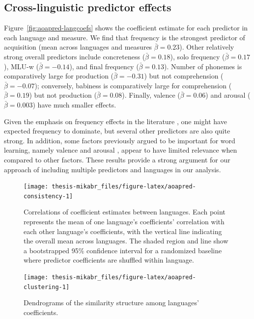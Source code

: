 \documentclass[
   11pt,
       ]{book}
\begin{document}
\hypertarget{cross-linguistic-predictor-effects}{%
\subsection{Cross-linguistic predictor effects}\label{cross-linguistic-predictor-effects}}

Figure~\ref{fig:aoapred-langcoefs} shows the coefficient estimate for each predictor in each language and measure.
We find that frequency is the strongest predictor of acquisition (mean across languages and measures \(\bar{\beta} = 0.23\)). Other relatively strong overall predictors include concreteness (\(\bar{\beta} = 0.18\)), solo frequency (\(\bar{\beta} = 0.17\)), MLU-w (\(\bar{\beta} = -0.14\)), and final frequency (\(\bar{\beta} = 0.13\)). Number of phonemes is comparatively large for production (\(\bar{\beta} = -0.31\)) but not comprehension (\(\bar{\beta} = -0.07\)); conversely, babiness is comparatively large for comprehension (\(\bar{\beta} = 0.19\)) but not production (\(\bar{\beta} = 0.08\)). Finally, valence (\(\bar{\beta} = 0.06\)) and arousal (\(\bar{\beta} = 0.003\)) have much smaller effects.

Given the emphasis on frequency effects in the literature \citep{ambridge2015}, one might have expected frequency to dominate, but several other predictors are also quite strong. In addition, some factors previously argued to be important for word learning, namely valence and arousal \citep{moors2013}, appear to have limited relevance when compared to other factors. These results provide a strong argument for our approach of including multiple predictors and languages in our analysis.

\begin{figure}

{\centering \texttt{[image: thesis-mikabr\_files/figure-latex/aoapred-consistency-1]} 

}

\caption{Correlations of coefficient estimates between languages. Each point represents the mean of one language's coefficients' correlation with each other language's coefficients, with the vertical line indicating the overall mean across languages. The shaded region and line show a bootstrapped 95\% confidence interval for a randomized baseline where predictor coefficients are shuffled within language.}\label{fig:aoapred-consistency}
\end{figure}

\begin{figure}

{\centering \texttt{[image: thesis-mikabr\_files/figure-latex/aoapred-clustering-1]} 

}

\caption{Dendrograms of the similarity structure among languages' coefficients.}\label{fig:aoapred-clustering}
\end{figure}
\end{document}
